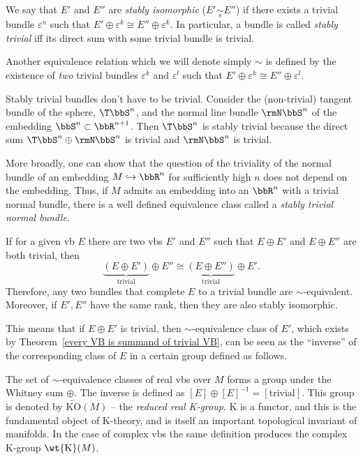 \begin{defn}
We say that $E'$ and $E''$ are \emph{stably isomorphic} ($E'\underset{\mathrm{s}}{\sim}E''$) if there exists a trivial bundle $\varepsilon^n$ such that $E'\oplus \varepsilon^k \cong E''\oplus\varepsilon^k$. In particular, a bundle is called \emph{stably trivial} iff its direct sum with some trivial bundle is trivial.

Another equivalence relation which we will denote simply $\sim$ is defined by the existence of \emph{two} trivial bundles $\varepsilon^k$ and $\varepsilon^l$ such that $E'\oplus \varepsilon^k\cong E''\oplus \varepsilon^l$.
\end{defn}

\begin{example}
    Stably trivial bundles don't have to be trivial. Consider the (non-trivial) tangent bundle of the sphere, $\T\bbS^n$, and  the normal line bundle $\rmN\bbS^n$ of the embedding $\bbS^n\subset \bbR^{n+1}$. Then $\T\bbS^n$ is stably trivial because the direct sum $\T\bbS^n\oplus \rmN\bbS^n$ is trivial and $\rmN\bbS^n$ is trivial.

    More broadly, one can show that the question of the triviality of the normal bundle of an embedding $M\hookrightarrow \bbR^n$ for sufficiently high $n$ does not depend on the embedding. Thus, if $M$ admits an embedding into an $\bbR^n$ with a trivial normal bundle, there is a well defined equivalence class called a \emph{stably trivial normal bundle}.
\end{example}


\begin{cor}
If for a given \gls{vb} $E$ there are two \glspl{vb} $E'$ and $E''$ such that $E\oplus E'$ and $E\oplus E''$ are both trivial, then 
\[
\underbrace{(E\oplus E')}_{\text{trivial}}\oplus E''\cong \underbrace{(E\oplus E'')}_{\text{trivial}}\oplus E'.\]
Therefore, any two bundles that complete $E$ to a trivial bundle are $\sim$-equivalent. Moreover, if $E',E''$ have the same rank, then they are also stably isomorphic.
\end{cor}

This means that if $E\oplus E'$ is trivial, then $\sim$-equivalence class of $E'$, which exists by Theorem~\ref{every VB is summand of trivial VB}, can be seen as the ``inverse'' of the corresponding class of $E$ in a certain group defined as follows.

\begin{defn}
The set of $\sim$-equivalence classes of real \glspl{vb} over $M$ forms a group under the Whitney sum $\oplus$.
The inverse is defined as $[E]\oplus [E]^{-1}=[\text{trivial}]$. This group is denoted by $\widetilde{\mathrm{KO}}(M)$ -- the \emph{reduced real K-group}. K is a functor, and this is the fundamental object of K-theory, and is itself an important topological invariant of manifolds. In the case of complex \glspl{vb} the same definition produces the complex K-group $\wt{\mathrm{K}}(M)$.
\end{defn}

